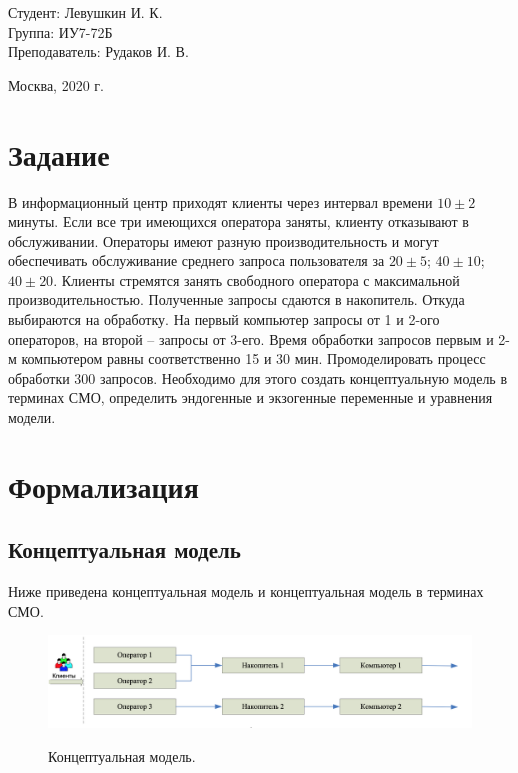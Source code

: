 \documentclass[a4paper,12pt]{article}
\begin{document}
	\large
	\begin{flushright}
		Студент: Левушкин И. К. \\
		Группа: ИУ7-72Б \\
		Преподаватель: Рудаков И. В. \\
	\end{flushright}
	
	\vspace*{25mm}
	\begin{center}
		Москва, 2020 г.  
	\end{center}
	\thispagestyle{empty}
	
	
	\newpage
	
	\section*{Задание}
	
	В информационный центр приходят клиенты через интервал времени $10 \pm 2$ минуты. Если все три имеющихся оператора заняты, клиенту отказывают в обслуживании. Операторы имеют разную производительность и могут обеспечивать обслуживание среднего запроса пользователя за $20 \pm 5$; $40 \pm 10$; $40 \pm 20$. Клиенты стремятся занять свободного оператора с максимальной производительностью. Полученные запросы сдаются в накопитель. Откуда выбираются на обработку. На первый компьютер запросы от 1 и 2-ого операторов, на второй – запросы от 3-его. Время обработки запросов первым и 2-м компьютером равны соответственно 15 и 30 мин. Промоделировать процесс обработки 300 запросов. 
	Необходимо для этого создать концептуальную модель в терминах СМО, определить эндогенные и экзогенные переменные и уравнения модели.
	
	\newpage
	
	\section*{Формализация}
	
	\subsection*{Концептуальная модель}
	
	Ниже приведена концептуальная модель и концептуальная модель в терминах СМО.
	
	\begin{figure}[h!]
		\begin{center}
			{\includegraphics[scale = 0.6]{model1.png}}
			\label{ris:model1}
		\end{center}
		\caption{Концептуальная модель.}
	\end{figure}
\end{document}
